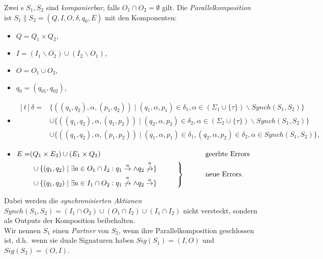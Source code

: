 \begin{Def}[Parallelkomposition]
  \label{DefParallelkomposition}
  Zwei \EIO{}s $S_1, S_2$ sind \emph{komponierbar}, falls
  $O_1\cap O_2=\emptyset$ gilt. Die \emph{Parallelkomposition} ist
  $S_1\|S_2=(Q,I,O,\delta ,q_0,E)$ mit den Komponenten:
  \begin{itemize}
    \item $Q=Q_1\times Q_2$,
    \item $I=(I_1\backslash O_2)\cup(I_2\backslash O_1)$,
    \item $O=O_1\cup O_2$,
    \item $q_0=(q_{01},q_{02})$,
    \item $\begin{aligned}[t]
    \delta =&\{((q_1,q_2),\alpha ,(p_1,q_2))\mid (q_1,\alpha ,p_1)\in\delta
      _1,\alpha\in(\Sigma _1\cup\{\tau\})\backslash Synch(S_1,S_2)\}\\
      &\cup\{((q_1,q_2),\alpha ,(q_1,p_2))\mid (q_2,\alpha ,p_2)\in\delta
      _2,\alpha\in(\Sigma _2\cup\{\tau\})\backslash Synch(S_1,S_2)\}\\
      &\cup\{((q_1,q_2),\alpha ,(p_1,p_2))\mid (q_1,\alpha ,p_1)\in\delta
      _1, (q_2,\alpha ,p_2)\in\delta _2, \alpha\in Synch(S_1,S_2)\},
  \end{aligned}$
    \item $\begin{aligned}[t]
        E=&(Q_1\times E_2)\cup (E_1\times Q_2)
        &&\phantom{neue}\mathrm{geerbte}~\mathrm{Errors}\\
        &\left.\begin{aligned}
        &\cup\{(q_1,q_2)\mid \exists a\in O_1\cap I_2: q_1\overset{a}{\rightarrow}\wedge
      q_2\overset{a}{\not{\hspace{-0.1cm}\rightarrow}}\}\\
      &\cup\{(q_1,q_2)\mid \exists a\in I_1\cap O_2:
q_1\overset{a}{\not{\hspace{-0.1cm}\rightarrow}}\wedge
q_2\overset{a}{\rightarrow}\}
\end{aligned}\hspace{1cm}\right\}
      &&\phantom{neue}\mathrm{neue}~\mathrm{Errors}.\\
  \end{aligned}$
  \end{itemize}
  Dabei werden die \emph{synchronisierten Aktionen} $Synch(S_1,
  S_2)=(I_1\cap O_2)\cup(O_1\cap I_2)\cup (I_1\cap I_2)$ nicht versteckt,
  sondern als Outputs der Komposition beibehalten.\\
  Wir nennen $S_1$ einen \emph{Partner} von $S_2$, wenn ihre
  Parallelkomposition geschlossen ist, d.h.\ wenn sie duale Signaturen haben
  $Sig(S_1)=(I,O)$ und $Sig(S_2)=(O,I)$.
\end{Def}


